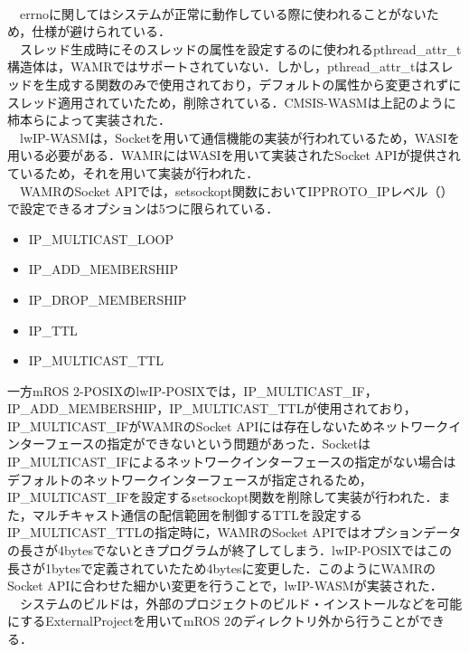 \\　errnoに関してはシステムが正常に動作している際に使われることがないため，仕様が避けられている．
\\　スレッド生成時にそのスレッドの属性を設定するのに使われるpthread\_attr\_t構造体は，WAMRではサポートされていない．しかし，pthread\_attr\_tはスレッドを生成する関数のみで使用されており，デフォルトの属性から変更されずにスレッド適用されていたため，削除されている．CMSIS-WASMは上記のように柿本らによって実装された．
\\　lwIP-WASMは，Socketを用いて通信機能の実装が行われているため，WASIを用いる必要がある．WAMRにはWASIを用いて実装されたSocket APIが提供されているため，それを用いて実装が行われた．
\\　WAMRのSocket APIでは，setsockopt関数においてIPPROTO\_IPレベル（）で設定できるオプションは5つに限られている．
\begin{itemize}
    \item IP\_MULTICAST\_LOOP
    \item IP\_ADD\_MEMBERSHIP
    \item IP\_DROP\_MEMBERSHIP
    \item IP\_TTL
    \item IP\_MULTICAST\_TTL
\end{itemize}
一方mROS 2-POSIXのlwIP-POSIXでは，IP\_MULTICAST\_IF，IP\_ADD\_MEMBERSHIP，IP\_MULTICAST\_TTLが使用されており，IP\_MULTICAST\_IFがWAMRのSocket APIには存在しないためネットワークインターフェースの指定ができないという問題があった．SocketはIP\_MULTICAST\_IFによるネットワークインターフェースの指定がない場合はデフォルトのネットワークインターフェースが指定されるため，IP\_MULTICAST\_IFを設定するsetsockopt関数を削除して実装が行われた．また，マルチキャスト通信の配信範囲を制御するTTLを設定するIP\_MULTICAST\_TTLの指定時に，WAMRのSocket APIではオプションデータの長さが4bytesでないときプログラムが終了してしまう．lwIP-POSIXではこの長さが1bytesで定義されていたため4bytesに変更した．このようにWAMRのSocket APIに合わせた細かい変更を行うことで，lwIP-WASMが実装された．
\\　システムのビルドは，外部のプロジェクトのビルド・インストールなどを可能にするExternalProjectを用いてmROS 2のディレクトリ外から行うことができる．